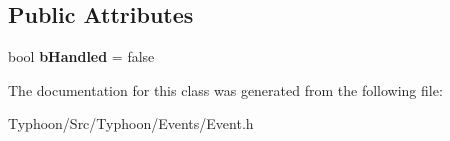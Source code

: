 \subsection*{Public Attributes}
\begin{DoxyCompactItemize}
\item 
\mbox{\label{class_typhoon_engine_1_1_event_af06be934d04d50ad52a4bf58b3bd66e9}} 
bool {\bfseries b\+Handled} = false
\end{DoxyCompactItemize}


The documentation for this class was generated from the following file\+:\begin{DoxyCompactItemize}
\item 
Typhoon/\+Src/\+Typhoon/\+Events/Event.\+h\end{DoxyCompactItemize}
